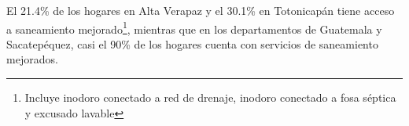 El 21.4\% de los hogares en Alta Verapaz y el 30.1\% en Totonicapán tiene acceso a saneamiento mejorado\footnote{Incluye inodoro conectado a red de drenaje, inodoro conectado a fosa séptica y excusado lavable}, mientras que en los departamentos de Guatemala y Sacatepéquez, casi el 90\% de los hogares cuenta con servicios de saneamiento mejorados.